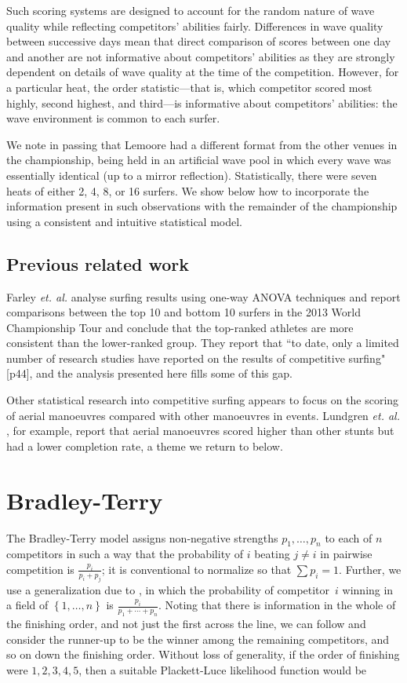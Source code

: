 \documentclass{article}
\begin{document}
Such scoring systems are designed to account for the random nature of
wave quality while reflecting competitors' abilities fairly.
Differences in wave quality between successive days mean that direct
comparison of scores between one day and another are not informative
about competitors' abilities as they are strongly dependent on details
of wave quality at the time of the competition.  However, for a
particular heat, the order statistic---that is, which competitor
scored most highly, second highest, and third---is informative about
competitors' abilities: the wave environment is common to each surfer.

We note in passing that Lemoore had a different format from the other
venues in the championship, being held in an artificial wave pool in
which every wave was essentially identical (up to a mirror
reflection).  Statistically, there were seven heats of either 2, 4, 8,
or 16 surfers.  We show below how to incorporate the information
present in such observations with the remainder of the championship
using a consistent and intuitive statistical model.

\subsection{Previous related work}

Farley {\em et. al.} \cite{farley2013} analyse surfing results using
one-way ANOVA techniques and report comparisons between the top 10 and
bottom 10 surfers in the 2013 World Championship Tour and conclude
that the top-ranked athletes are more consistent than the lower-ranked
group.  They report that ``to date, only a limited number of research
studies have reported on the results of competitive surfing" [p44],
and the analysis presented here fills some of this gap.

Other statistical research into competitive surfing appears to focus
on the scoring of aerial manoeuvres compared with other manoeuvres in
events.  Lundgren {\em et. al.} \cite{lundgren2014}, for example,
report that aerial manoeuvres scored higher than other stunts but had
a lower completion rate, a theme we return to below.

\section{Bradley-Terry}

The Bradley-Terry model \cite{bradley1954} assigns non-negative strengths
$p_1,\ldots, p_n$ to each of $n$ competitors in such a way that the
probability of $i$ beating $j\neq i$ in pairwise competition is
$\frac{p_i}{p_i+p_j}$; it is conventional to normalize so that $\sum
p_i=1$.  Further, we use a generalization due to \cite{luce1959}, in which
the probability of competitor~$i$ winning in a field of $\left\lbrace
1,\ldots, n\right\rbrace$ is $\frac{p_i}{p_1+\cdots +p_n}$.  Noting
that there is information in the whole of the finishing order, and not
just the first across the line, we can follow \cite{plackett1975} and
consider the runner-up to be the winner among the remaining
competitors, and so on down the finishing order. Without loss of
generality, if the order of finishing were $1,2,3,4,5$, then a
suitable Plackett-Luce likelihood function would be
\end{document}
